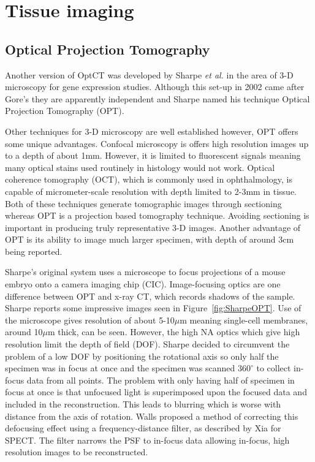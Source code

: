 \documentclass[12pt]{article}
\begin{document}
\newpage
\section{Tissue imaging}
\subsection{Optical Projection Tomography}

Another version of OptCT was  developed by Sharpe \textit{et al.} in the area of 3-D microscopy for gene expression studies. \cite{Sharpe:2002jp} Although this set-up in 2002 came after Gore's they are apparently independent and Sharpe named his technique Optical Projection Tomography (OPT).

Other techniques for 3-D microscopy are well established however, OPT offers some unique advantages. 
Confocal microscopy is offers high resolution images up to a depth of about 1mm. \cite{Webb:1996} However, it is limited to fluorescent signals meaning many optical stains used routinely in histology would not work. Optical coherence tomography (OCT), which is commonly used in ophthalmology, is capable of micrometer-scale resolution with  depth limited to 2-3mm in tissue. \cite{huang1993optical} Both of these techniques generate tomographic images through sectioning whereas OPT is a projection based tomography technique. \cite{Sharpe:2003cm} Avoiding sectioning is important in producing truly representative 3-D images. \cite{Oldham:2007ku} Another advantage of  OPT is its ability to  image much larger specimen, with depth of around 3cm being reported. \cite{Oldham:2007ku} 

Sharpe's original system uses a microscope to focus projections of a mouse embryo onto a camera imaging chip (CIC). Image-focusing optics are one difference between OPT and x-ray CT, which records shadows of the sample. \cite{Sharpe:2002jp} Sharpe reports some impressive images seen in Figure~\ref{fig:SharpeOPT}. Use of the microscope gives resolution of about 5-10$\mu$m meaning single-cell membranes, around 10$\mu$m thick, can be seen.\cite{Sharpe:2002jp} However, the high NA  optics which give high resolution limit the depth of field (DOF). Sharpe decided to circumvent the problem of a low DOF by positioning the rotational axis so only half the specimen was in focus at once and the specimen was scanned $360^{\circ}$ to collect in-focus data from all points. 
The problem with only having half of specimen in focus at once is that unfocused light is superimposed upon the focused data and included in the reconstruction. This leads to blurring which is worse with distance from the axis of rotation. Walls proposed a method of correcting this defocusing effect using a frequency-distance filter, as described by Xia for SPECT. \cite{xia1995fourier,Walls:2007jl} The filter narrows the PSF to in-focus data allowing in-focus, high resolution images to be reconstructed. \cite{Walls:2007jl}
\end{document}
